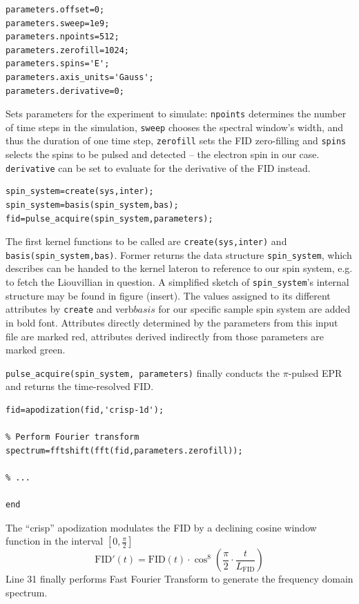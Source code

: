 \documentclass[11.5pt,a4paper]{article}
\begin{document}
\begin{lstlisting}[firstnumber=last]
% Set the sequence parameters
parameters.offset=0;
parameters.sweep=1e9;
parameters.npoints=512;
parameters.zerofill=1024;
parameters.spins='E';
parameters.axis_units='Gauss';
parameters.derivative=0;
\end{lstlisting}
Sets parameters for the experiment to simulate: \verb$npoints$ determines the number of time steps in the simulation, \verb$sweep$ chooses the spectral window's width, and thus the duration of one time step, \verb$zerofill$ sets the FID zero-filling and \verb$spins$ selects the spins to be pulsed and detected -- the electron spin in our case. \verb$derivative$ can be set to evaluate for the derivative of the FID instead.

\begin{lstlisting}[firstnumber=last]
% Run Spinach
spin_system=create(sys,inter);
spin_system=basis(spin_system,bas);
fid=pulse_acquire(spin_system,parameters);
\end{lstlisting}
The first kernel functions to be called are \verb$create(sys,inter)$ and \verb$basis(spin_system,bas)$. Former returns the data structure \verb$spin_system$, which describes  can be handed to the kernel lateron to reference to our spin system, e.g. to fetch the Liouvillian in question. A simplified sketch of \verb$spin_system$'s internal structure may be found in figure (insert). The values assigned to its different attributes by \verb$create$ and verb$basis$ for our specific sample spin system are added in bold font. Attributes directly determined by the parameters from this input file are marked red, attributes derived indirectly from those parameters are marked green.
 
\verb$pulse_acquire(spin_system, parameters)$ finally conducts the $\pi$-pulsed EPR and returns the time-resolved FID.
\begin{lstlisting}[firstnumber=last]
% Apodization
fid=apodization(fid,'crisp-1d');

% Perform Fourier transform
spectrum=fftshift(fft(fid,parameters.zerofill));

% ...

end
\end{lstlisting}
The ``crisp'' apodization modulates the FID by a declining cosine window function in the interval $[0,\tfrac{\pi}{2}]$
\begin{equation}
 \text{FID}'(t) = \text{FID}(t) \cdot \cos^8 \left( \frac{\pi}{2} \cdot \frac{t}{L_\text{FID}} \right)
\end{equation}
Line 31 finally performs Fast Fourier Transform to generate the frequency domain spectrum.
\end{document}
